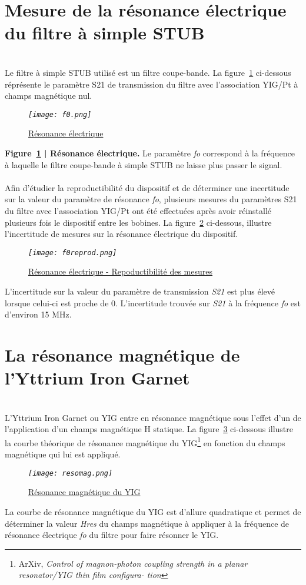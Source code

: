 \documentclass[12pt,fleqn]{book} %
\begin{document}
\section{Mesure de la résonance électrique du filtre à simple STUB}
~\\\indent Le filtre à simple STUB utilisé est un filtre coupe-bande. La figure~\underline{\color{blue}\ref{fo}} ci-dessous réprésente le paramètre S21 de transmission du filtre avec l'association YIG/Pt à champs magnétique nul.
\begin{figure}[H]
	\centering
	\itshape
	\texttt{[image: f0.png]}
	\caption{\label{fo} \underline{Résonance électrique}}
\end{figure}
\noindent\footnotesize  \textbf{Figure~\underline{\color{blue}\ref{fo}} | Résonance électrique.} Le paramètre \emph{fo} correspond à la fréquence à laquelle le filtre coupe-bande à simple STUB ne laisse plus passer le signal.
~\\\\
\normalsize Afin d'étudier la reproductibilité du dispositif et de déterminer une incertitude sur la valeur du paramètre de résonance \emph{fo}, plusieurs mesures du paramètres S21 du filtre avec l'association YIG/Pt ont été effectuées après avoir réinstallé plusieurs fois le dispositif entre les bobines. 
La figure~\underline{\color{blue}\ref{foreprod}} ci-dessous, illustre l'incertitude de mesures sur la résonance électrique du dispositif.
\begin{figure}[H]
	\centering
	\itshape
	\texttt{[image: f0reprod.png]}
	\caption{\label{foreprod} \underline{Résonance électrique - Repoductibilité des mesures}}
\end{figure}
\noindent L'incertitude sur la valeur du paramètre de transmission \emph{S21} est plus élevé lorsque celui-ci est proche de 0. L'incertitude trouvée sur \emph{S21} à la fréquence \emph{fo} est d'environ 15 MHz.
\section{La résonance magnétique de l'Yttrium Iron Garnet}
~\\\indent L'Yttrium Iron Garnet ou YIG entre en résonance magnétique sous l'effet d'un de l'application d'un champs magnétique H statique. La figure~\underline{\color{blue}\ref{resomag}} ci-dessous illustre la courbe théorique de résonance magnétique du YIG\footnote{ArXiv, \emph{Control of magnon-photon coupling strength in a planar resonator/YIG thin film configura-
tion}} en fonction du champs magnétique qui lui est appliqué.
\begin{figure}[H]
	\centering
	\itshape
	\texttt{[image: resomag.png]}
	\caption{\label{resomag} \underline{Résonance magnétique du YIG}}
\end{figure}
La courbe de résonance magnétique du YIG est d'allure quadratique et permet de déterminer la valeur \emph{Hres} du champs magnétique à appliquer à la fréquence de résonance électrique \emph{fo} du filtre pour faire résonner le YIG. 
\end{document}
